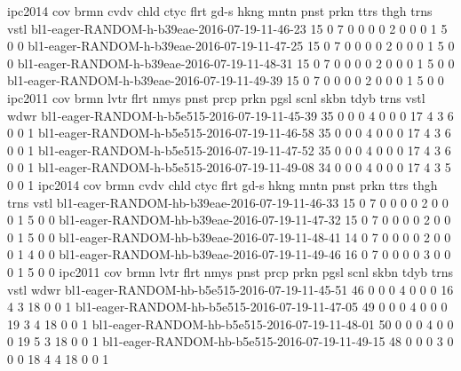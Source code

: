 ipc2014                                         cov  brmn  cvdv  chld  ctyc  flrt  gd-s  hkng  mntn  pnst  prkn  ttrs  thgh  trns  vstl  
bl1-eager-RANDOM-h-b39eae-2016-07-19-11-46-23   15   0     7     0     0     0     0     2     0     0     0     1     5     0     0  
bl1-eager-RANDOM-h-b39eae-2016-07-19-11-47-25   15   0     7     0     0     0     0     2     0     0     0     1     5     0     0  
bl1-eager-RANDOM-h-b39eae-2016-07-19-11-48-31   15   0     7     0     0     0     0     2     0     0     0     1     5     0     0  
bl1-eager-RANDOM-h-b39eae-2016-07-19-11-49-39   15   0     7     0     0     0     0     2     0     0     0     1     5     0     0  
ipc2011                                         cov  brmn  lvtr  flrt  nmys  pnst  prcp  prkn  pgsl  scnl  skbn  tdyb  trns  vstl  wdwr  
bl1-eager-RANDOM-h-b5e515-2016-07-19-11-45-39   35   0     0     0     4     0     0     0     17    4     3     6     0     0     1  
bl1-eager-RANDOM-h-b5e515-2016-07-19-11-46-58   35   0     0     0     4     0     0     0     17    4     3     6     0     0     1  
bl1-eager-RANDOM-h-b5e515-2016-07-19-11-47-52   35   0     0     0     4     0     0     0     17    4     3     6     0     0     1  
bl1-eager-RANDOM-h-b5e515-2016-07-19-11-49-08   34   0     0     0     4     0     0     0     17    4     3     5     0     0     1  
ipc2014                                         cov  brmn  cvdv  chld  ctyc  flrt  gd-s  hkng  mntn  pnst  prkn  ttrs  thgh  trns  vstl  
bl1-eager-RANDOM-hb-b39eae-2016-07-19-11-46-33  15   0     7     0     0     0     0     2     0     0     0     1     5     0     0  
bl1-eager-RANDOM-hb-b39eae-2016-07-19-11-47-32  15   0     7     0     0     0     0     2     0     0     0     1     5     0     0  
bl1-eager-RANDOM-hb-b39eae-2016-07-19-11-48-41  14   0     7     0     0     0     0     2     0     0     0     1     4     0     0  
bl1-eager-RANDOM-hb-b39eae-2016-07-19-11-49-46  16   0     7     0     0     0     0     3     0     0     0     1     5     0     0  
ipc2011                                         cov  brmn  lvtr  flrt  nmys  pnst  prcp  prkn  pgsl  scnl  skbn  tdyb  trns  vstl  wdwr  
bl1-eager-RANDOM-hb-b5e515-2016-07-19-11-45-51  46   0     0     0     4     0     0     0     16    4     3     18    0     0     1  
bl1-eager-RANDOM-hb-b5e515-2016-07-19-11-47-05  49   0     0     0     4     0     0     0     19    3     4     18    0     0     1  
bl1-eager-RANDOM-hb-b5e515-2016-07-19-11-48-01  50   0     0     0     4     0     0     0     19    5     3     18    0     0     1  
bl1-eager-RANDOM-hb-b5e515-2016-07-19-11-49-15  48   0     0     0     3     0     0     0     18    4     4     18    0     0     1  
